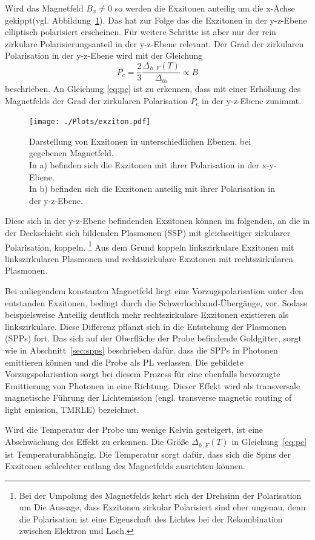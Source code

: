 
Wird das Magnetfeld $B_x \neq 0 $ so werden die Exzitonen anteilig um die x-Achse gekippt(vgl. Abbildung~\ref{fig:exziton}).
Das hat zur Folge das die Exzitonen in der y-z-Ebene elliptisch polarisiert erscheinen. 
Für weitere Schritte ist aber nur der rein zirkulare Polarisierungsanteil in der y-z-Ebene relevant.
Der Grad der zirkularen Polarisation in der y-z-Ebene wird mit der Gleichung
\begin{equation}
    P_c = \frac{2}{3} \frac{\Delta_{h,F}(T)}{\Delta_{lh}} \propto B
    \label{eq:pc}
\end{equation}  
beschrieben.
An Gleichung \ref{eq:pc} ist zu erkennen, dass mit einer Erhöhung des Magnetfelds der Grad der zirkularen Polarisation $P_c$
in der y-z-Ebene zunimmt.
\begin{figure}
    \centering
    \texttt{[image: ./Plots/exziton.pdf]}
    \caption{Darstellung von Exzitonen in unterschiedlichen Ebenen, bei gegebenen Magnetfeld.\\
    In a) befinden sich die Exzitonen mit ihrer Polarisation in der x-y-Ebene.\\
    In b) befinden sich die Exzitonen anteilig mit ihrer Polarisation in der y-z-Ebene.\cite{lars}}
    \label{fig:exziton}
\end{figure}
\FloatBarrier

Diese sich in der y-z-Ebene befindenden Exzitonen können im folgenden, an die in der Deckschicht sich bildenden 
Plasmonen (SSP) mit gleichseitiger zirkularer Polarisation, koppeln.
\footnote{Bei der Umpolung des Magnetfelds kehrt sich der Drehsinn der Polarisation um  
Die Aussage, dass Exzitonen zirkular Polarisiert sind eher ungenau, denn die Polarisation
ist eine Eigenschaft des Lichtes bei der Rekombination zwischen Elektron und Loch.}
Aus dem Grund koppeln linkszirkulare Exzitonen mit linkszirkularen Plasmonen und 
rechtszirkulare Exzitonen mit rechtszirkularen Plasmonen.

Bei anliegendem konstanten Magnetfeld liegt eine Vorzugspolarisation unter 
den entstanden Exzitonen, bedingt durch die Schwerlochband-Übergänge, vor.
Sodass beispielsweise Anteilig deutlich mehr rechtszirkulare Exzitonen existieren
als linkszirkulare. 
Diese Differenz pflanzt sich in die Entstehung der Plasmonen (SPPs) fort.
Das sich auf der Oberfläche der Probe befindende Goldgitter, sorgt wie in Abschnitt~\ref{sec:spps}
beschrieben dafür, dass die SPPs in Photonen emittieren können und die Probe als PL verlassen.
Die gebildete Vorzugspolarisation sorgt bei diesem Prozess für eine ebenfalls bevorzugte Emittierung von Photonen
in eine Richtung. 
Dieser Effekt wird als transversale magnetische Führung der Lichtemission 
(engl. transverse magnetic routing of light emission, TMRLE) bezeichnet.

Wird die Temperatur der Probe um wenige Kelvin gesteigert, ist eine Abschwächung des Effekt zu erkennen.
Die Größe $\Delta_{h,F}(T)$ in Gleichung~\ref{eq:pc} ist Temperaturabhängig. 
Die Temperatur sorgt dafür, dass sich die Spins der Exzitonen schlechter entlang
des Magnetfelds ausrichten können.\cite{felix}